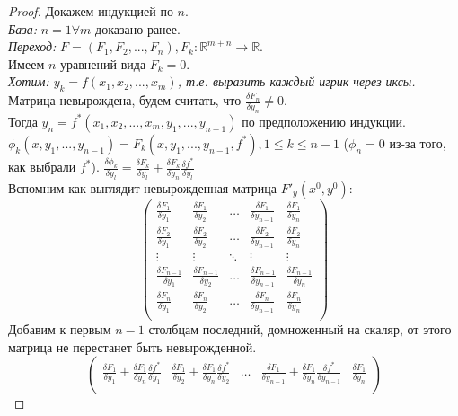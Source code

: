 \documentclass{article}
\theoremstyle{indented}
\theoremstyle{definition}
\theoremstyle{remark}
\begin{document}
\begin{proof}
    Докажем индукцией по $n$.\\
    \textit{База: } $n=1 \forall m$ доказано ранее.\\
    \textit{Переход: } $F=(F_1, F_2, ... , F_n), F_k: \mathbb{R}^{m+n} \to \mathbb{R}$.\\
    Имеем $n$ уравнений вида $F_k = 0$.\\ 
    \textit{Хотим: $y_k=f(x_1, x_2, ..., x_m)$, т.е. выразить каждый игрик через иксы.}\\
    Матрица невырождена, будем считать, что $\frac{\delta F_n}{\delta y_n} \not= 0$.\\
    Тогда $y_n = f^*(x_1, x_2, ... , x_m, y_1, ... , y_{n-1})$
    по предположению индукции. \\
    $\phi_k(x,y_1, ..., y_{n-1}) = F_k(x,y_1, ..., y_{n-1}, f^*), 1 \leq k \leq n-1$ ($\phi_n = 0$ из-за того, как выбрали $f^*$).
    $\frac{\delta \phi_k}{\delta y_l} = \frac{\delta F_k}{\delta y_l} + \frac{\delta F_k}{\delta y_n} \frac{\delta f^*}{\delta y_l}$\\
    Вспомним как выглядит невырожденная матрица $F'_y(x^0, y^0)$:
    $$
    \begin{pmatrix}
        \frac{\delta F_1}{\delta y_1} & \frac{\delta F_1}{\delta y_2} &\ldots & \frac{\delta F_1}{\delta y_{n-1}} & \frac{\delta F_1}{\delta y_n}\\
        \frac{\delta F_2}{\delta y_1} & \frac{\delta F_2}{\delta y_2} &\ldots & \frac{\delta F_2}{\delta y_{n-1}} & \frac{\delta F_2}{\delta y_n}\\
        \vdots                        & \vdots                        &\ddots & \vdots                        &  \vdots                      \\
        \frac{\delta F_{n-1}}{\delta y_1} & \frac{\delta F_{n-1}}{\delta y_2} &\ldots & \frac{\delta F_{n-1}}{\delta y_{n-1}} & \frac{\delta F_{n-1}}{\delta y_n}\\
        \frac{\delta F_n}{\delta y_1} & \frac{\delta F_n}{\delta y_2} &\ldots & \frac{\delta F_n}{\delta y_{n-1}} & \frac{\delta F_n}{\delta y_n}\\
    \end{pmatrix}    
    $$
    Добавим к первым $n-1$ столбцам последний, домноженный на скаляр, от этого матрица не перестанет быть невырожденной.
    \newcommand{\df}[2]{\frac{\delta #1}{\delta #2}}
    $$
    \begin{pmatrix}
        \df{F_1}{y_1} + \df{F_1}{y_n} \df{f^*}{y_1} & \df{F_1}{y_2} + \df{F_1}{y_n} \df{f^*}{y_2} &\ldots & \df{F_1}{y_{n-1}} + \df{F_1}{y_n} \df{f^*}{y_{n-1}} & \df{F_1}{y_n}\\

\end{pmatrix}$$
\end{proof}
\end{document}
